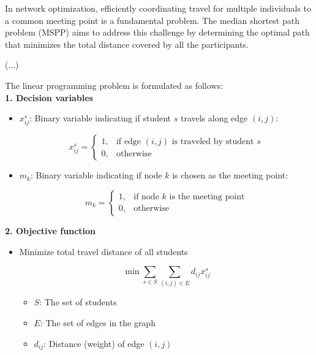 \documentclass[12pt]{report}
\begin{document}
In network optimization, efficiently coordinating travel for multiple individuals to a common meeting point is a fundamental problem. The median shortest path problem (MSPP) aims to address this challenge by determining the optimal path that minimizes the total distance covered by all the participants.

(...)

The linear programming problem is formulated as follows:\\

\textbf{1. Decision variables}
\begin{itemize}
    \item $x^s_{ij}$: Binary variable indicating if student $s$ travels along edge $(i,j)$:
    
    $$x^s_{ij} = \begin{cases}
        1, & \text{if edge } (i,j) \text{ is traveled by student } s\\
        0, & \text{otherwise}
    \end{cases}$$

    \item $m_k$: Binary variable indicating if node $k$ is chosen as the meeting point:
    
    $$m_k = \begin{cases}
        1, & \text{if node } k \text{ is the meeting point}\\
        0, & \text{otherwise}
    \end{cases}$$
\end{itemize}

\textbf{2. Objective function}
\begin{itemize}
    \item Minimize total travel distance of all students

    $$\min \sum_{s \in S} \sum_{(i,j)\in E} d_{ij} x^s_{ij}$$
    \begin{itemize}
        \item $S$: The set of students
        \item $E$: The set of edges in the graph
        \item $d_{ij}$: Distance (weight) of edge $(i,j)$
    \end{itemize}
\end{itemize}
\end{document}
